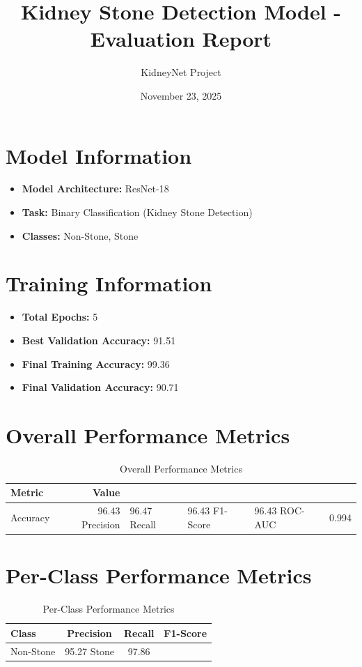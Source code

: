 \documentclass[11pt,a4paper]{article}
\title{Kidney Stone Detection Model - Evaluation Report}
\author{KidneyNet Project}
\date{November 23, 2025}
\begin{document}
\maketitle

\section{Model Information}
\begin{itemize}
\item \textbf{Model Architecture:} ResNet-18
\item \textbf{Task:} Binary Classification (Kidney Stone Detection)
\item \textbf{Classes:} Non-Stone, Stone
\end{itemize}

\section{Training Information}
\begin{itemize}
\item \textbf{Total Epochs:} 5
\item \textbf{Best Validation Accuracy:} 91.51%
\item \textbf{Final Training Accuracy:} 99.36%
\item \textbf{Final Validation Accuracy:} 90.71%
\end{itemize}

\section{Overall Performance Metrics}
\begin{table}[H]
\centering
\begin{tabular}{lr}
\toprule
Metric & Value \\
\midrule
Accuracy & 96.43%
Precision & 96.47%
Recall & 96.43%
F1-Score & 96.43%
ROC-AUC & 0.994 \\
\bottomrule
\end{tabular}
\caption{Overall Performance Metrics}
\end{table}

\section{Per-Class Performance Metrics}
\begin{table}[H]
\centering
\begin{tabular}{lccc}
\toprule
Class & Precision & Recall & F1-Score \\
\midrule
Non-Stone & 95.27%
Stone & 97.86%
\bottomrule
\end{tabular}
\caption{Per-Class Performance Metrics}
\end{table}
\end{document}
